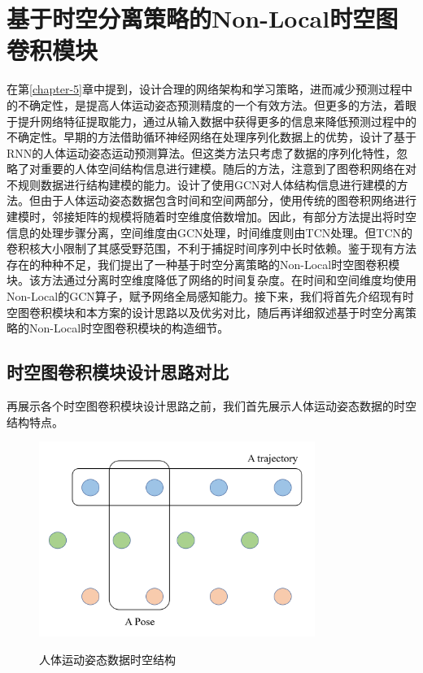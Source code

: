 \chapter{基于时空分离策略的Non-Local时空图卷积模块}\label{section:ST-DGCN}
在第\ref{chapter-5}章中提到，设计合理的网络架构和学习策略，进而减少预测过程中的不确定性，是提高人体运动姿态预测精度的一个有效方法。但更多的方法，着眼于提升网络特征提取能力，通过从输入数据中获得更多的信息来降低预测过程中的不确定性。早期的方法借助循环神经网络在处理序列化数据上的优势，设计了基于RNN的人体运动姿态运动预测算法。但这类方法只考虑了数据的序列化特性，忽略了对重要的人体空间结构信息进行建模。随后的方法，注意到了图卷积网络在对不规则数据进行结构建模的能力。设计了使用GCN对人体结构信息进行建模的方法。但由于人体运动姿态数据包含时间和空间两部分，使用传统的图卷积网络进行建模时，邻接矩阵的规模将随着时空维度倍数增加。因此，有部分方法提出将时空信息的处理步骤分离，空间维度由GCN处理，时间维度则由TCN\cite{oord2016wavenet}处理。但TCN的卷积核大小限制了其感受野范围，不利于捕捉时间序列中长时依赖。鉴于现有方法存在的种种不足，我们提出了一种基于时空分离策略的Non-Local时空图卷积模块。该方法通过分离时空维度降低了网络的时间复杂度。在时间和空间维度均使用Non-Local的GCN算子，赋予网络全局感知能力。接下来，我们将首先介绍现有时空图卷积模块和本方案的设计思路以及优劣对比，随后再详细叙述基于时空分离策略的Non-Local时空图卷积模块的构造细节。

\section{时空图卷积模块设计思路对比}
再展示各个时空图卷积模块设计思路之前，我们首先展示人体运动姿态数据的时空结构特点。

\begin{figure}[ht]
    \centering
    \includegraphics[width=0.80\textwidth]{FigMa/human_pose_seq.png}\\
    \vspace{-0.3cm}
    \caption{人体运动姿态数据时空结构}
    \label{fig:human_pose_seq_structure}
\end{figure}

